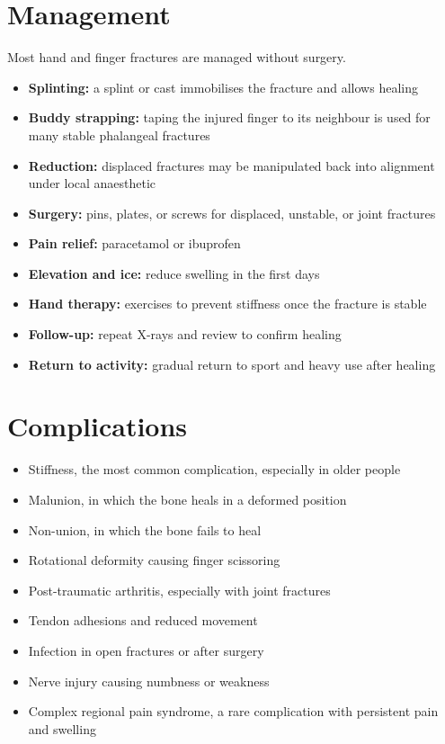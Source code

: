 \section*{Management}
Most hand and finger fractures are managed without surgery.

\begin{itemize}
    \item \textbf{Splinting:} a splint or cast immobilises the fracture and allows healing
    \item \textbf{Buddy strapping:} taping the injured finger to its neighbour is used for many stable phalangeal fractures
    \item \textbf{Reduction:} displaced fractures may be manipulated back into alignment under local anaesthetic
    \item \textbf{Surgery:} pins, plates, or screws for displaced, unstable, or joint fractures
    \item \textbf{Pain relief:} paracetamol or ibuprofen
    \item \textbf{Elevation and ice:} reduce swelling in the first days
    \item \textbf{Hand therapy:} exercises to prevent stiffness once the fracture is stable
    \item \textbf{Follow-up:} repeat X-rays and review to confirm healing
    \item \textbf{Return to activity:} gradual return to sport and heavy use after healing
\end{itemize}

\section*{Complications}
\begin{itemize}
    \item Stiffness, the most common complication, especially in older people
    \item Malunion, in which the bone heals in a deformed position
    \item Non-union, in which the bone fails to heal
    \item Rotational deformity causing finger scissoring
    \item Post-traumatic arthritis, especially with joint fractures
    \item Tendon adhesions and reduced movement
    \item Infection in open fractures or after surgery
    \item Nerve injury causing numbness or weakness
    \item Complex regional pain syndrome, a rare complication with persistent pain and swelling
\end{itemize}


